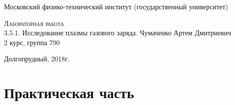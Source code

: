 \documentclass[12pt]{article}
\begin{document}
\begin{titlepage}
  \begin{center}
  \large
    Московский физико-технический институт (государственный университет)
    \vfill
 
    \textsc{Лабораторная работа}\\[5mm]
  
    {\LARGE 3.5.1. Исследование плазмы газового заряда.}
  \vfill
    Чумаченко Артем Дмитриевич \\
    2 курс, группа 790
\end{center}
\vfill
 
\begin{center}
  Долгопрудный, 2018г.
\end{center}
\end{titlepage}


\section{Практическая часть}
\end{document}
